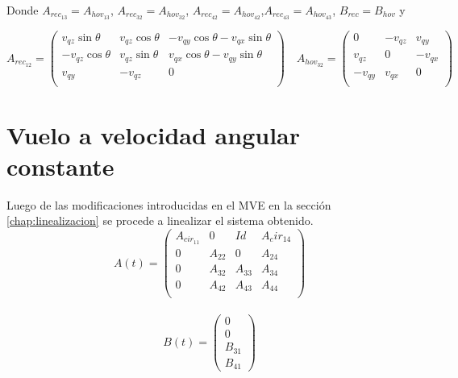Donde $A_{rec_{13}}=A_{hov_{13}}$, $A_{rec_{32}}=A_{hov_{32}}$, $A_{rec_{42}}=A_{hov_{42}}$,$A_{rec_{43}}=A_{hov_{43}}$,    $B_{rec}=B_{hov}$ y 

\begin{equation}
A_{rec_{12}}=\left(\begin{array}{ccc}
v_{qz}\sin\theta & v_{qz}\cos\theta & -v_{qy}\cos\theta-v_{qx}\sin\theta \\
-v_{qz}\cos\theta & v_{qz}\sin\theta & v_{qx}\cos\theta-v_{qy}\sin\theta \\
v_{qy} & -v_{qz} &0\\
\end{array}\right) \quad 
A_{hov_{32}}=\left(\begin{array}{ccc}
0 & -v_{qz} & v_{qy} \\
v_{qz} & 0 & -v_{qx}\\
-v_{qy} & v_{qx} &0\\
\end{array}\right)
\end{equation}

\section{Vuelo a velocidad angular constante}
Luego de las modificaciones introducidas en el MVE en la secci\'on \ref{chap:linealizacion} se procede a linealizar el sistema obtenido.
\begin{equation}
A(t)=\left(\begin{array}{cccc}
A_{cir_{11}} & 0 & Id & A{_cir_{14}}  \\
0 & A_{22} & 0      & A_{24}\\
0 & A_{32} & A_{33} & A_{34}\\
0 & A_{42}      & A_{43}      & A_{44} \\    
\end{array}\right)
\end{equation}\\


\begin{equation}
B(t)=\left(\begin{array}{c}
0\\
0\\
B_{31}\\
B_{41} 
\end{array}\right)
\end{equation}\\

